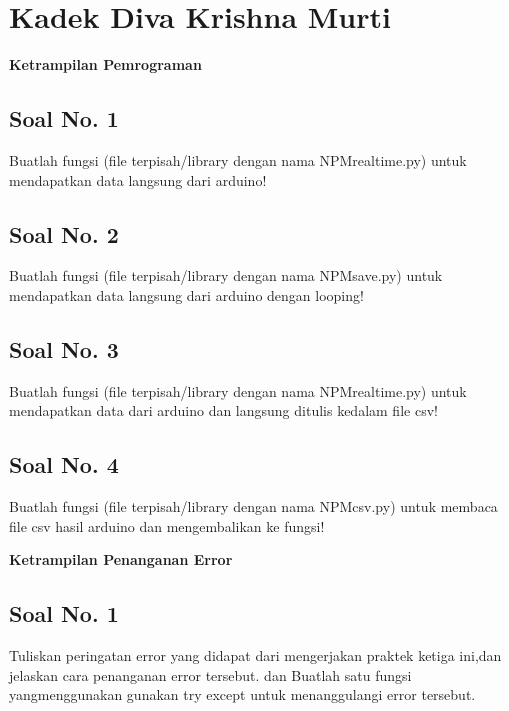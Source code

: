\section{Kadek Diva Krishna Murti}
{\Large \textbf{Ketrampilan Pemrograman}}
\subsection{Soal No. 1}
Buatlah  fungsi  (file  terpisah/library  dengan  nama  NPMrealtime.py)  untuk mendapatkan data langsung dari arduino!

\subsection{Soal No. 2}
Buatlah fungsi (file terpisah/library dengan nama NPMsave.py) untuk mendapatkan data langsung dari arduino dengan looping!

\subsection{Soal No. 3}
Buatlah  fungsi  (file  terpisah/library  dengan  nama  NPMrealtime.py)  untuk mendapatkan data dari arduino dan langsung ditulis kedalam file csv!

\subsection{Soal No. 4}
Buatlah fungsi (file terpisah/library dengan nama NPMcsv.py) untuk membaca file csv hasil arduino dan mengembalikan ke fungsi!


\hfill \break
{\Large \textbf{Ketrampilan Penanganan Error}}

\subsection{Soal No. 1}
Tuliskan  peringatan  error  yang  didapat  dari  mengerjakan  praktek  ketiga  ini,dan  jelaskan  cara  penanganan  error  tersebut.   dan  Buatlah  satu  fungsi  yangmenggunakan gunakan try except untuk menanggulangi error tersebut.